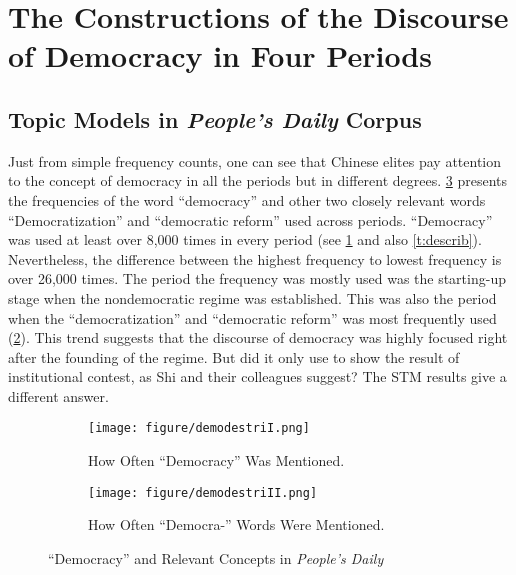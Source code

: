 \documentclass[abstracton,UTF8]{ctexart}
\begin{document}
\section{The Constructions of the Discourse of Democracy in Four Periods}
\subsection{Topic Models in \textit{People's Daily} Corpus}
Just from simple frequency counts, one can see that Chinese elites pay attention to the concept of democracy in all the periods but in different degrees. \cref{f:descDem} presents the frequencies of the word ``democracy'' and other two closely relevant words ``Democratization'' and ``democratic reform'' used across periods. ``Democracy'' was used at least over 8,000 times in every period (see \cref{f:descDemI} and also \cref{t:describ}). Nevertheless, the difference between the highest frequency to lowest frequency is over 26,000 times. The period the frequency was mostly used was the starting-up stage when the nondemocratic regime was established. This was also the period when the ``democratization'' and ``democratic reform'' was most frequently used (\cref{f:descDemII}). This trend suggests that the discourse of democracy was highly focused right after the founding of the regime. But did it only use to show the result of institutional contest, as Shi and their colleagues suggest? The STM results give a different answer.  

\begin{figure}[htbp]
	\begin{subfigure}{0.6\textwidth}
		\texttt{[image: figure/demodestriI.png]}
		\caption{How Often ``Democracy'' Was Mentioned.}
		\label{f:descDemI}
	\end{subfigure}
	\begin{subfigure}{0.6\textwidth}
		\texttt{[image: figure/demodestriII.png]}
		\caption{How Often ``Democra-'' Words Were Mentioned.}
		\label{f:descDemII}
	\end{subfigure}
	\caption{``Democracy'' and Relevant Concepts in \textit{People's Daily}}
	\label{f:descDem}
\end{figure}
\end{document}

